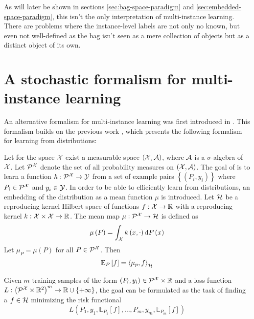As will later be shown in sections \ref{sec:bag-space-paradigm} and \ref{sec:embedded-space-paradigm}, this isn't the only interpretation of multi-instance learning. There are problems where the instance-level labels are not only no known, but even not well-defined as the bag isn't seen as a mere collection of objects but as a distinct object of its own.

\section{A stochastic formalism for multi-instance learning}
An alternative formalism for multi-instance learning was first introduced in \cite{pevny_using_2017}. This formalism builds on the previous work \cite{muandet_learning_2012}, which presents the following formalism for learning from distributions:

Let for the space \( \mathcal{X} \) exist a measurable space \( \left( \mathcal{X}, \mathcal{A} \right) \), where \( \mathcal{A} \) is a \( \sigma \)-algebra of \( \mathcal{X} \). Let \( \mathcal{P}^\mathspace{X} \) denote the set of all probability measures on \( \left( \mathcal{X}, \mathcal{A} \right) \). The goal of is to learn a function \( h : \mathcal{P}^{\mathcal{X}} \to \mathcal{Y} \) from a set of example pairs \( \left\{ \left( P_i, y_i \right) \right\} \) where \( P_i \in \mathcal{P}^\mathspace{X} \) and \( y_i \in \mathcal{Y} \). In order to be able to efficiently learn from distributions, an embedding of the distribution as a mean function \( \mu \) is introduced. Let \( \mathcal{H} \) be a reproducing kernel Hilbert space of functions \( f : \mathcal{X} \to \mathbb{R} \) with a reproducing kernel \( k : \mathcal{X} \times \mathcal{X} \to \mathbb{R} \). The mean map \( \mu : \mathcal{P}^\mathspace{X} \to \mathspace{H} \) is defined as
\[ \mu \left( P \right) = \int_\mathspace{X} k \left( x, \cdot \right) \mathrm{d}P \left( x \right) \]
Let \( \mu_P = \mu \left( P \right) \) for all \( P \in \mathcal{P}^\mathspace{X} \). Then
\[ \mathbb{E}_P \left[ f \right] = \Braket{\mu_p, f}_\mathspace{H} \]

Given \( m \) training samples of the form \( \left( P_i, y_i \right) \in \mathcal{P}^\mathspace{X} \times \mathfield{R} \) and a loss function \( L : \left( \mathcal{P}^\mathspace{X} \times \mathfield{R}^2 \right)^m \to \mathfield{R} \cup \left\{ +\infty \right\} \), the goal can be formulated as the task of finding a \( f \in \mathcal{H} \) minimizing the risk functional
\[ L \left( P_1, y_1, \mathbb{E}_{P_1} \left[ f \right], \dots, P_m, y_m, \mathbb{E}_{P_m} \left[ f \right] \right) \]

